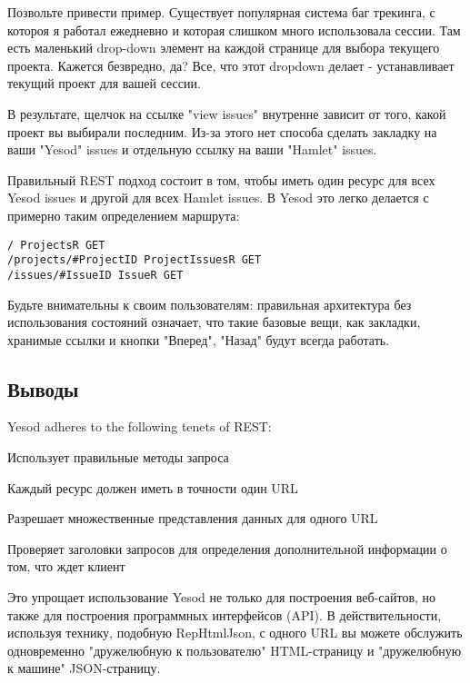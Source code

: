 Позвольте привести пример. Существует популярная система баг трекинга, с котороя я работал ежедневно и которая слишком много использовала сессии. Там есть маленький drop-down элемент на каждой странице для выбора текущего проекта. Кажется безвредно, да? Все, что этот dropdown делает - устанавливает текущий проект для вашей сессии.

В результате, щелчок на ссылке "view issues" внутренне зависит от того, какой проект вы выбирали последним. Из-за этого нет способа сделать закладку на ваши "Yesod" issues и отдельную ссылку на ваши "Hamlet" issues.

Правильный REST подход состоит в том, чтобы иметь один ресурс для всех Yesod issues и другой для всех Hamlet issues. В Yesod это легко делается с примерно таким определением маршрута:

\begin{lstlisting}
/ ProjectsR GET
/projects/#ProjectID ProjectIssuesR GET
/issues/#IssueID IssueR GET
\end{lstlisting}

Будьте внимательны к своим пользователям: правильная архитектура без использования состояний означает, что такие базовые вещи, как закладки, хранимые ссылки и кнопки "Вперед", "Назад" будут всегда работать.

\subsection{Выводы}

Yesod adheres to the following tenets of REST:
\item{Использует правильные методы запроса}
\item{Каждый ресурс должен иметь в точности один URL}
\item{Разрешает множественные представления данных для одного URL}
\item{Проверяет заголовки запросов для определения дополнительной информации о том, что ждет клиент}

Это упрощает использование Yesod не только для построения веб-сайтов, но также для построения программных интерфейсов (API). В действительности, используя технику, подобную RepHtmlJson, с одного URL вы можете обслужить одновременно "дружелюбную к пользователю" HTML-страницу и "дружелюбную к машине" JSON-страницу.







 



